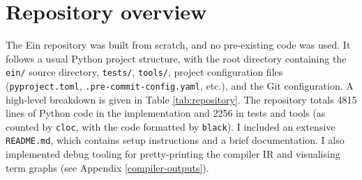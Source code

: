\needspace{4em}
\section{Repository overview}
\label{repository-overview}

The Ein repository was built from scratch, and no pre-existing code was used.
It follows a usual Python project structure, with the root directory containing the \texttt{ein/} source directory, \texttt{tests/}, \texttt{tools/}, project configuration files (\texttt{pyproject.toml}, \texttt{.pre-commit-config.yaml}, etc.), and the Git configuration. 
A high-level breakdown is given in Table \ref{tab:repository}. The repository totals 4815 lines of Python code in the implementation and 2256 in tests and tools (as counted by \texttt{cloc}, with the code formatted by \texttt{black}). I included an extensive \texttt{README.md}, which contains setup instructions and a brief documentation. I also implemented debug tooling for pretty-printing the compiler IR and visualising term graphs (see Appendix \ref{compiler-outputs}).

